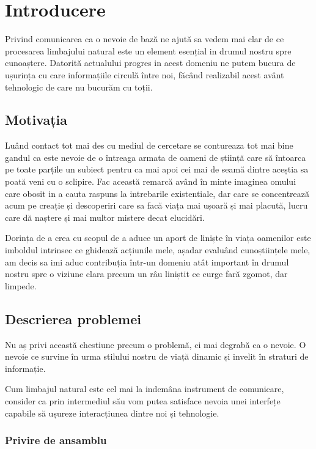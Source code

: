 \chapter{Introducere}

Privind comunicarea ca o nevoie de bază ne ajută sa vedem mai clar de ce procesarea limbajului natural este un element esențial in drumul nostru spre cunoaștere. Datorită actualului progres in acest domeniu ne putem bucura de ușurința cu care informațiile circulă între noi, făcând realizabil acest avânt tehnologic de care nu bucurăm cu toții.

\section{Motivația}

Luând contact tot mai des cu mediul de cercetare se contureaza tot mai bine gandul ca este nevoie de o întreaga armata de oameni de știință care să întoarca pe toate parțile un subiect pentru ca mai apoi cei mai de seamă dintre aceștia sa poată veni cu o sclipire. Fac această remarcă având în minte imaginea omului care obosit in a cauta raspuns la intrebarile existentiale, dar care se concentrează acum pe creație și descoperiri care sa facă viața mai ușoară și mai placută, lucru care dă naștere și mai multor mistere decat elucidări.

Dorința de a crea cu scopul de a aduce un aport de liniște în viața oamenilor este imboldul intrinsec ce ghidează acțiunile mele, așadar evaluând cunoștiințele mele, am decis sa imi aduc contribuția într-un domeniu atât important în drumul nostru spre o viziune clara precum un râu liniștit ce curge fară zgomot, dar limpede.


\section{Descrierea problemei}

Nu aș privi această chestiune precum o problemă, ci mai degrabă ca o nevoie. O nevoie ce survine în urma stilului nostru de viață dinamic și invelit în straturi de informație.

Cum limbajul natural este cel mai la indemâna instrument de comunicare, consider ca prin intermediul său vom putea satisface nevoia unei interfețe capabile să ușureze interacțiunea dintre noi și tehnologie.

\subsection{Privire de ansamblu}

